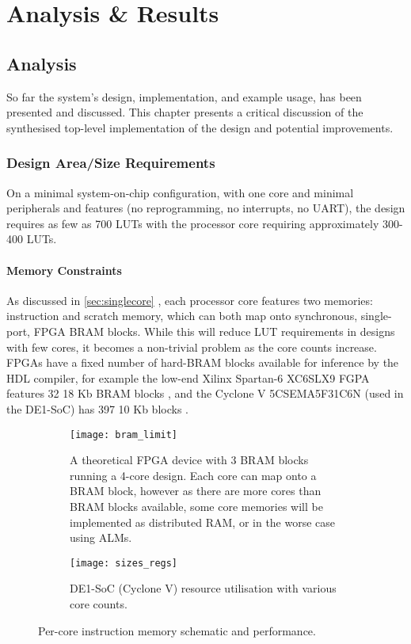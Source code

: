 \chapter{Analysis \& Results}
\startcontents[chapters]

\section{Analysis}
So far the system's design, implementation, and example usage, has been presented and discussed. This chapter presents a critical discussion of the synthesised top-level implementation of the design and potential improvements. 

\subsection{Design Area/Size Requirements}
On a minimal system-on-chip configuration, with one core and minimal peripherals and features (no reprogramming, no interrupts, no UART), the design requires as few as 700 LUTs with the processor core requiring approximately 300-400 LUTs.

\subsubsection{Memory Constraints}
As discussed in \cref{sec:singlecore} , each processor core features two memories: instruction and scratch memory, which can both map onto synchronous, single-port, FPGA BRAM blocks. While this will reduce LUT requirements in designs with few cores, it becomes a non-trivial problem as the core counts increase. FPGAs have a fixed number of hard-BRAM blocks available for inference by the HDL compiler, for example the low-end Xilinx Spartan-6 XC6SLX9 FGPA features 32 18 Kb BRAM blocks \cite[p.~2]{s6fam}, and the Cyclone V 5CSEMA5F31C6N (used in the DE1-SoC) has 397 10 Kb blocks \cite[p.~22]{cvfam}.

\begin{figure}[h]
\begin{subfigure}{.5\textwidth}
  \centering
  \texttt{[image: bram\_limit]}
  \caption{A theoretical FPGA device with 3 BRAM blocks running a 4-core design. Each core can map onto a BRAM block, however as there are more cores than BRAM blocks available, some core memories will be implemented as distributed RAM, or in the worse case using ALMs.}
  \label{fig:bram_limita}
\end{subfigure}%
\begin{subfigure}{.5\textwidth}
  \centering
  \texttt{[image: sizes\_regs]}
  \caption{DE1-SoC (Cyclone V) resource utilisation with various core counts.}
  \label{fig:bram_limitb}
\end{subfigure}
\caption{Per-core instruction memory schematic and performance.}
\label{fig:bram_limit}
\end{figure}


